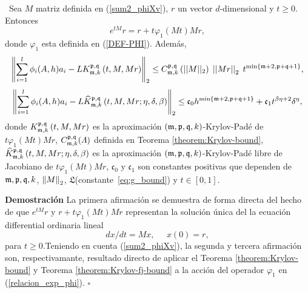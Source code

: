\begin{theorem} \label{theorem:Krylov-and-Krylov-fj-bounds}
	\cite{naranjo2023computing,naranjo2023RT}~Sea $M$ matriz definida en (\ref{sum2_phiXv}), $r$ un vector $d$-dimensional y $t\geq 0$. Entonces
    \begin{equation} 
    	e^{tM}r = r + t\varphi_1 (Mt)Mr, \label{relacion_exp_phi}
    \end{equation}
	donde $\varphi_1$ esta definida en (\ref{DEF-PHI}). Además,
	\begin{equation}
      \left\Vert\sum\limits_{i=1}^{l}\phi _{i}(A,h)a_{i}-	L K_{\mathfrak{m},k}^{\mathfrak{p},\mathfrak{q}}\left(t, M, Mr \right)
      \right\Vert_2 \leq C_{\mathfrak{m},k}^{\mathfrak{p},\mathfrak{q}}\left(\lvert\lvert M \rvert\rvert_2\right) \;
	  \left\lvert \left\lvert Mr \right\rvert \right\rvert_2 \; t^{\mathrm{min}\left\{ \mathfrak{m}+2,\mathfrak{p}+\mathfrak{q}+1 \right\}}, \label{phi_approx}
	\end{equation}
	\begin{equation}
		\left\Vert \sum\limits_{i=1}^{l}\phi _{i}(A,h)a_{i} - L \widehat{K}_{\mathfrak{m},k}^{\mathfrak{p},\mathfrak{q}}\left(t, M , Mr ; \eta, \delta, \beta \right)
		\right\Vert_2 \leq \mathfrak{c}_0 h^{\min\{\mathfrak{m}+2,\mathfrak{p}+\mathfrak{q}+1\}} + \mathfrak{c}_1 t^{\beta\eta+2}\delta^{\eta}, \label{phi_approx_fj}
	\end{equation}
	donde $K_{\mathfrak{m},k}^{\mathfrak{p},\mathfrak{q}}\left(t, M, Mr \right)$ es la aproximación $(\mathfrak{m} , \mathfrak{p} ,\mathfrak{q} , k)$-Krylov-Padé de $t\varphi_1 (Mt)Mr$,  $C_{\mathfrak{m},k}^{\mathfrak{p},\mathfrak{q}}(\varLambda)$ definida en Teorema \ref{theorem:Krylov-bound}, $\widehat{K}_{\mathfrak{m},k}^{\mathfrak{p},\mathfrak{q}}\left(t, M , Mr ; \eta, \delta, \beta \right)$  es la aproximación $(\mathfrak{m} , \mathfrak{p} ,\mathfrak{q} , k)$-Krylov-Padé libre de Jacobiano de $t\varphi_1 (Mt)Mr$, $\mathfrak{c}_0$ y $\mathfrak{c}_1$ son constantes positivas que dependen de $\mathfrak{m},\mathfrak{p},\mathfrak{q},k$, $\left\lVert M \right\rVert_2$, $\mathfrak{L}$(constante~\ref{eq:g_bound}) y $t \in [0,1]$.
\end{theorem}
\textbf{Demostración} La primera afirmación se demuestra de forma directa del hecho de que $e^{tM}r$ y $r + t\varphi_1 (Mt)Mr$ representan la solución única del la ecuación differential ordinaria lineal
\[ dx/dt= Mx,  \;\;\;\;\; x(0)=r, \]
para $t\geq 0$.Teniendo en cuenta (\ref{sum2_phiXv}), la segunda y tercera afirmación son, respectivamante, resultado directo de aplicar el Teorema \ref{theorem:Krylov-bound} y Teorema \ref{theorem:Krylov-fj-bound} a la acción del operador $\varphi_1$ en (\ref{relacion_exp_phi}).
$\square$

